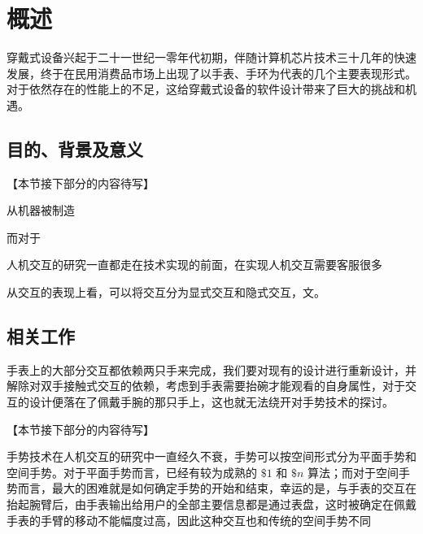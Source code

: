 \chapter{概述}

穿戴式设备兴起于二十一世纪一零年代初期，伴随计算机芯片技术三十几年的快速发展，终于在民用消费品市场上出现了以手表、手环为代表的几个主要表现形式。对于依然存在的性能上的不足，这给穿戴式设备的软件设计带来了巨大的挑战和机遇\cite{DBLP:journals/corr/JiangCZZKZ15}。

\section{目的、背景及意义}

【本节接下部分的内容待写】

从机器被制造\cite{dongshihai2004}

而对于

人机交互的研究一直都走在技术实现的前面，在实现人机交互\cite{hudson2014concepts}需要客服很多

从交互的表现上看，可以将交互分为显式交互和隐式交互，文\cite{yuweining2004}。

\section{相关工作}

手表上的大部分交互都依赖两只手来完成，我们要对现有的设计进行重新设计，并解除对双手接触式交互的依赖，考虑到手表需要抬碗才能观看的自身属性，对于交互的设计便落在了佩戴手腕的那只手上，这也就无法绕开对手势技术的探讨。

【本节接下部分的内容待写】

手势技术在人机交互的研究中一直经久不衰，手势可以按空间形式分为平面手势和空间手势。对于平面手势而言，已经有较为成熟的 $\$1$ \cite{wobbrock2007gestures}和 $\$n$ \cite{anthony2010lightweight}算法；而对于空间手势而言，最大的困难就是如何确定手势的开始和结束，幸运的是，与手表的交互在抬起腕臂后，由手表输出给用户的全部主要信息都是通过表盘，这时被确定在佩戴手表的手臂的移动不能幅度过高，因此这种交互也和传统的空间手势不同

